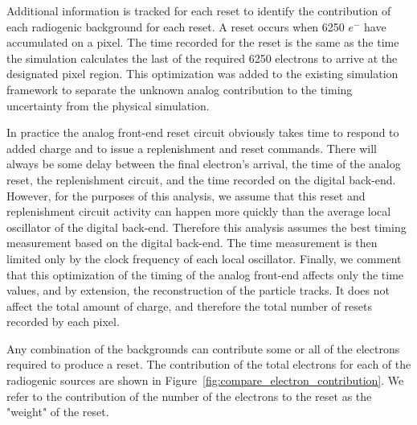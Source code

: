 Additional information is tracked for each reset to identify the contribution of each radiogenic background for each reset.
A reset occurs when 6250 $e^{-}$ have accumulated on a pixel.
The time recorded for the reset is the same as the time the simulation calculates the last of the required 6250 electrons to arrive at the designated pixel region.
This optimization was added to the existing simulation framework to separate the unknown analog contribution to the timing uncertainty from the physical simulation.

In practice the analog front-end reset circuit obviously takes time to respond to added charge and to issue a replenishment and reset commands.
There will always be some delay between the final electron's arrival, the time of the analog reset, the replenishment circuit, and the time recorded on the digital back-end.
However, for the purposes of this analysis, we assume that this reset and replenishment circuit activity can happen more quickly than the average local oscillator of the digital back-end. 
Therefore this analysis assumes the best timing measurement based on the digital back-end.
The time measurement is then limited only by the clock frequency of each local oscillator.
Finally, we comment that this optimization of the timing of the analog front-end affects only the time values, and by extension, the reconstruction of the particle tracks.
It does not affect the total amount of charge, and therefore the total number of resets recorded by each pixel.

Any combination of the backgrounds can contribute some or all of the electrons required to produce a reset.
The contribution of the total electrons for each of the radiogenic sources are shown in Figure~\ref{fig:compare_electron_contribution}.
We refer to the contribution of the number of the electrons to the reset as the "weight" of the reset.

